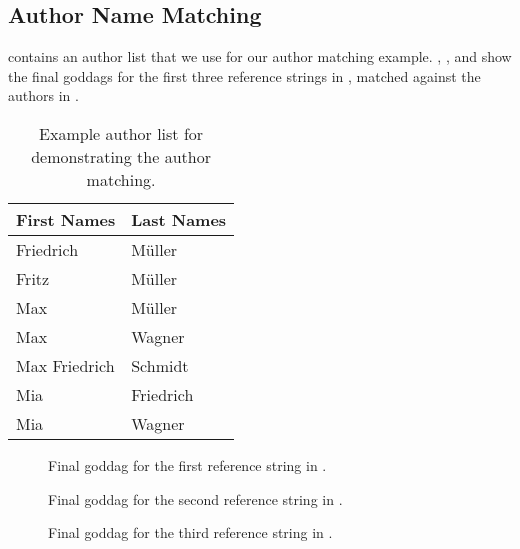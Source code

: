 \subsection{Author Name Matching}\label{app:author-name-matching}
 contains an author list that we use for our author matching example.
, , and  show the final \glspl{goddag} for the first three reference strings in , matched against the authors in .
\begin{table}[h]
\centering
\begin{tabular}{l l}
 \toprule
 First Names & Last Names\\
 \midrule
 Friedrich & M\"{u}ller\\
 Fritz & M\"{u}ller\\
 Max & M\"{u}ller\\
 Max & Wagner\\
 Max Friedrich & Schmidt\\
 Mia & Friedrich\\
 Mia & Wagner\\
 \bottomrule
\end{tabular}
\caption{Example author list for demonstrating the author matching.}
\label{tab:example-author-list}
\end{table}
\begin{figure}[h]
  \centering
  
\caption{Final \gls{goddag} for the first reference string in .}
\label{fig:example-goddag-1-final}
\end{figure}
\begin{figure}[h]
  \centering
  
\caption{Final \gls{goddag} for the second reference string in .}
\label{fig:example-goddag-2-final}
\end{figure}
\begin{figure}[h]
  \centering
  
\caption{Final \gls{goddag} for the third reference string in .}
\label{fig:example-goddag-3-final}
\end{figure}

